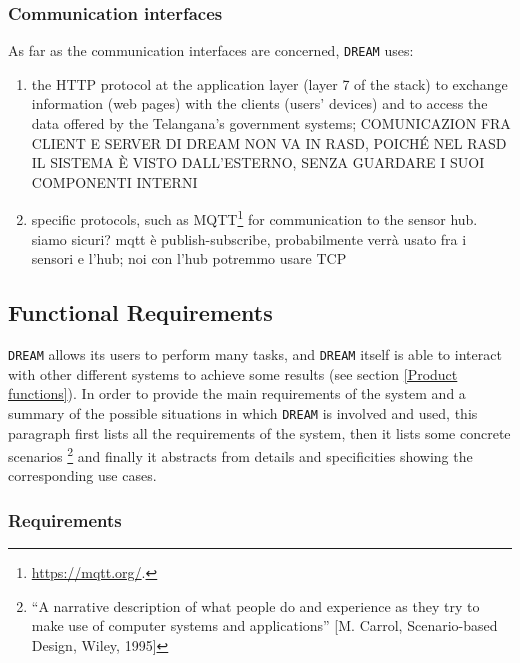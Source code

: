 \documentclass{article}
\begin{document}
\subsubsection{Communication interfaces}
As far as the communication interfaces are concerned, \verb|DREAM| uses:
\begin{enumerate}
    \color{red}
    \item the HTTP protocol at the application layer (layer 7 of the stack) to exchange information (web pages) with the clients (users’ devices) and to access the data offered by the Telangana’s government systems;
    COMUNICAZION FRA CLIENT E SERVER DI DREAM NON VA IN RASD, POICHÉ NEL RASD IL SISTEMA È VISTO DALL'ESTERNO, SENZA GUARDARE I SUOI COMPONENTI INTERNI
    \color{black}
    \item specific protocols, such as MQTT\footnote{\url{https://mqtt.org/}.} for communication to the sensor hub. 
    \color{red}
    siamo sicuri? mqtt è publish-subscribe, probabilmente verrà usato fra i sensori e l'hub; noi con l'hub potremmo usare TCP
    \color{black}
\end{enumerate}

\subsection{Functional Requirements}
\verb |DREAM| allows its users to perform many tasks, and \verb |DREAM| itself is able to interact with other different systems to achieve some results (see section \ref{Product functions}). In order to provide the main requirements of the system and a summary of the possible situations in which \verb |DREAM| is involved and used, this paragraph first lists all the requirements of the system, then it lists some concrete scenarios \footnote{“A narrative description of what people do and experience as
they try to make use of computer systems and applications” [M.
Carrol, Scenario-based Design, Wiley, 1995]} and finally it abstracts from details and specificities showing the corresponding use cases.
\subsubsection{Requirements}
\end{document}
